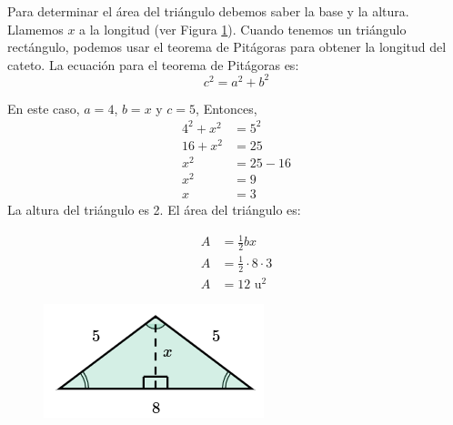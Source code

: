 \begin{solutionbox}{6cm}
    \footnotesize
    \begin{minipage}{0.6\textwidth}
        Para determinar el área del triángulo debemos saber la base y la altura. Llamemos $x$ a la longitud (ver Figura \ref{fig:area_isoseles_03a}).
        Cuando tenemos un triángulo rectángulo, podemos usar el teorema de Pitágoras para obtener la longitud del cateto.
        La ecuación para el teorema de Pitágoras es:
        \[c^2=a^2+b^2\]
        \begin{multicols}{2}
            En este caso, $a=4$, $b=x$ y $c=5$, Entonces,
            \begin{align*}
                4^2+x^2 & =5^2   \\
                16+x^2  & =25    \\
                x^2     & =25-16 \\
                x^2     & =9     \\
                x       & =3
            \end{align*}
            La altura del triángulo es 2. El área del triángulo es:

            \begin{align*}
                A & =\frac{1}{2}bx             \\
                A & =\frac{1}{2}\cdot 8\cdot 3 \\
                A & =12 \text{ u}^2
            \end{align*}
        \end{multicols}
    \end{minipage}\hfill
    \begin{minipage}{0.35\textwidth}
        \begin{figure}[H]
            \centering
            \includegraphics[width=0.6\linewidth]{../images/area_isoseles_03a.png}
            \caption{}
            \label{fig:area_isoseles_03a}
        \end{figure}
    \end{minipage}

\end{solutionbox}

